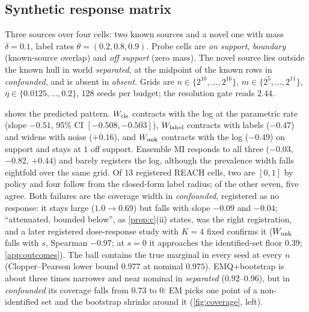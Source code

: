 \subsection{Synthetic response matrix}
\label{sec:exp-synthetic}

Three sources over four cells: two known sources and a novel one with mass $\delta=0.1$, label rates
$\theta=(0.2,0.8,0.9)$. Probe cells are \emph{on support}, \emph{boundary} (known-source overlap) and
\emph{off support} (zero mass). The novel source lies outside the known hull in world
\emph{separated}, at the midpoint of the known rows in \emph{confounded}, and is absent in
\emph{absent}. Grids are $n\in\{2^{10},\dots,2^{16}\}$, $m\in\{2^5,\dots,2^{11}\}$,
$\eta\in\{0.0125,\dots,0.2\}$, 128 seeds per budget; the resolution gate reads $2.44$.

\begin{table}[t]
\centering\small
\caption{Response matrix, world \emph{separated}, on-support probe: log-log slope of mean width
against each acquisition. Arrows: outside the placebo band; $0^{\ast}$: invariant by construction; the $\Wlab$ arrows follow from its
closed-form radius.
Bootstrap half-widths $<0.03$.}
\label{tab:synthetic}
\resizebox{\columnwidth}{!}{}
\end{table}

 shows the predicted pattern. $W_{\mathrm{cls}}$ contracts with the log at the parametric
rate (slope $-0.51$, 95\% CI $[-0.508,-0.503]$), $\Wlab$ contracts with labels ($-0.47$) and widens
with noise ($+0.16$), and $W_{\mathrm{unk}}$ contracts with the log ($-0.49$) on support and stays at $1$ off
support. Ensemble MI responds to all three ($-0.03$, $-0.82$, $+0.44$) and barely registers the log, although the
prevalence width falls eightfold over the same grid. Of 13 registered REACH cells, two are $[0,1]$ by policy and four follow from the closed-form label radius;
of the other seven, five agree. Both failures are the coverage width in \emph{confounded}, registered as no
response: it stays large ($1.0\to0.69$) but falls with slope $-0.09$ and $-0.04$; ``attenuated, bounded
below'', as \cref{prop:c}(ii) states, was the right registration, and a later registered dose-response study
with $K=4$ fixed confirms it ($W_{\mathrm{unk}}$ falls with $s$, Spearman $-0.97$; at $s=0$ it approaches the identified-set
floor $0.39$; \cref{app:outcomes}). The ball contains the true marginal in every
seed at every $n$ (Clopper--Pearson lower bound $0.977$ at nominal $0.975$). EMQ+bootstrap is about
three times narrower and near nominal in \emph{separated} ($0.92$--$0.96$), but in
\emph{confounded} its coverage falls from $0.73$ to $0$: EM picks one point of a non-identified set
and the bootstrap shrinks around it (\cref{fig:coverage}, left).

